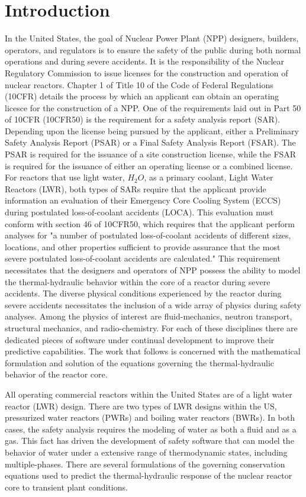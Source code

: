 \chapter{Introduction}
\label{chap:intro}
In the United States, the goal of Nuclear Power Plant (NPP) designers, builders, operators, and regulators is to ensure the safety of the public during both normal operations and during severe accidents.
It is the responsibility of the Nuclear Regulatory Commission to issue licenses for the construction and operation of nuclear reactors.
Chapter 1 of Title 10 of the Code of Federal Regulations (10CFR) details the process by which an applicant can obtain an operating licesce for the construction of a NPP.
One of the requirements laid out in Part 50 of 10CFR (10CFR50) is the requirement for a safety analysis report (SAR).
Depending upon the license being pursued by the applicant, either a Preliminary Safety Analysis Report (PSAR) or a Final Safety Analysis Report (FSAR).
The PSAR is required for the issuance of a site construction license, while the FSAR is required for the issuance of either an operating license or a combined license.
For reactors that use light water, $H_2 O$, as a primary coolant, Light Water Reactors (LWR), both types of SARs require that the applicant provide information an evaluation of their Emergency Core Cooling System (ECCS) during postulated loss-of-coolant accidents (LOCA).
This evaluation must conform with section 46 of 10CFR50, which requires that the applicant perform analyses for "a number of postulated loss-of-coolant accidents of different sizes, locations, and other properties sufficient to provide assurance that the most severe postulated loss-of-coolant accidents are calculated."
This requirement necessitates that the designers and operators of NPP possess the ability to model the thermal-hydraulic behavior within the core of a reactor during severe accidents.  
The diverse physical conditions experienced by the reactor during severe accidents necessitates the inclusion of a wide array of physics during safety analyses.
Among the physics of interest are fluid-mechanics, neutron transport, structural mechanics, and radio-chemistry.
For each of these disciplines there are dedicated pieces of software under continual development to improve their predictive capabilities.
The work that follows is concerned with the mathematical formulation and solution of the equations governing the thermal-hydraulic behavior of the reactor core.

All operating commercial reactors within the United States are of a light water reactor (LWR) design.
There are two types of LWR designs within the US, pressurized water reactors (PWRs) and boiling water reactors (BWRs).
In both cases, the safety analysis requires the modeling of water as both a fluid and as a gas.
This fact has driven the development of safety software that can model the behavior of water under a extensive range of thermodynamic states, including multiple-phases.
There are several formulations of the governing conservation equations used to predict the thermal-hydraulic response of the nuclear reactor core to transient plant conditions.

